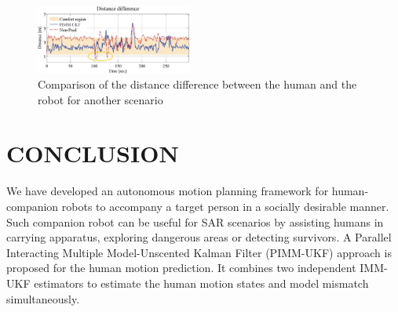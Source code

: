 \documentclass[journal]{IEEEtran}
\begin{document}
        \begin{figure} [t]
\centering	\includegraphics[width=0.46\textwidth]{figures/ddf}
		\caption{Comparison of the distance difference between the human and the robot for another scenario}
		\label{fig:constraint_violation}
\end{figure}	\section{CONCLUSION}\label{sec:conclusion}
	We have developed an autonomous motion planning framework for human-companion robots to accompany a target person in a socially desirable manner.
	Such companion robot can be useful for SAR scenarios by assisting humans in carrying apparatus, exploring dangerous areas or detecting survivors.
	A Parallel Interacting Multiple Model-Unscented Kalman Filter (PIMM-UKF) approach
    is proposed for the human motion prediction. 
    It combines two independent IMM-UKF estimators to estimate the human motion states and model mismatch simultaneously.
\end{document}
